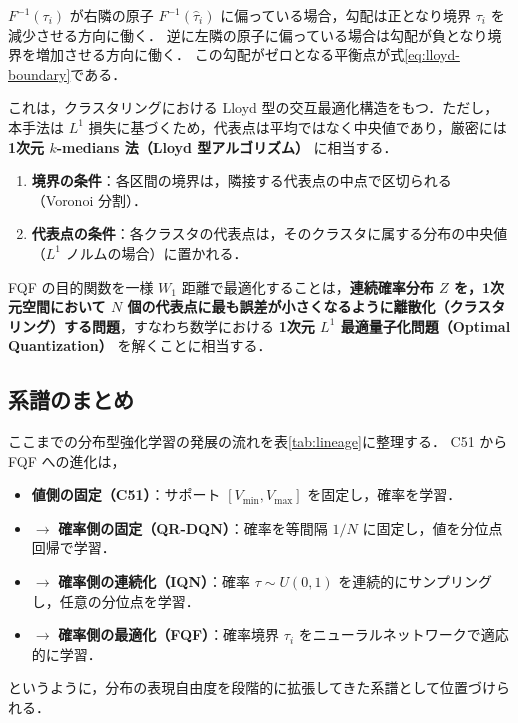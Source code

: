\documentclass[a4paper,10pt]{jsarticle}
\theoremstyle{definition}
\newcommand{\Wone}{W_1}
\renewcommand{\Finv}{F^{-1}}
\begin{document}
$\Finv(\tau_i)$ が右隣の原子 $\Finv(\hat\tau_i)$ に偏っている場合，勾配は正となり境界 $\tau_i$ を減少させる方向に働く．
逆に左隣の原子に偏っている場合は勾配が負となり境界を増加させる方向に働く．
この勾配がゼロとなる平衡点が式\eqref{eq:lloyd-boundary}である．

これは，クラスタリングにおける Lloyd 型の交互最適化構造をもつ．ただし，本手法は $L^1$ 損失に基づくため，代表点は平均ではなく中央値であり，厳密には \textbf{1次元 $k$-medians 法（Lloyd 型アルゴリズム）} に相当する．
\begin{enumerate}
  \item \textbf{境界の条件}：各区間の境界は，隣接する代表点の中点で区切られる（Voronoi 分割）．
  \item \textbf{代表点の条件}：各クラスタの代表点は，そのクラスタに属する分布の中央値（$L^1$ ノルムの場合）に置かれる．
\end{enumerate}
FQF の目的関数を一様 $\Wone$ 距離で最適化することは，\textbf{連続確率分布 $Z$ を，1次元空間において $N$ 個の代表点に最も誤差が小さくなるように離散化（クラスタリング）する問題}，すなわち数学における \textbf{1次元 $L^1$ 最適量子化問題（Optimal Quantization）} \cite{graf2000quantization} を解くことに相当する．

\subsection{系譜のまとめ}
\label{subsec:lineage}

ここまでの分布型強化学習の発展の流れを表\ref{tab:lineage}に整理する．
C51 から FQF への進化は，
\begin{itemize}
  \item \textbf{値側の固定（C51）}：サポート $[V_{\min}, V_{\max}]$ を固定し，確率を学習．
  \item $\to$ \textbf{確率側の固定（QR-DQN）}：確率を等間隔 $1/N$ に固定し，値を分位点回帰で学習．
  \item $\to$ \textbf{確率側の連続化（IQN）}：確率 $\tau \sim U(0, 1)$ を連続的にサンプリングし，任意の分位点を学習．
  \item $\to$ \textbf{確率側の最適化（FQF）}：確率境界 $\tau_i$ をニューラルネットワークで適応的に学習．
\end{itemize}
というように，分布の表現自由度を段階的に拡張してきた系譜として位置づけられる．
\end{document}
